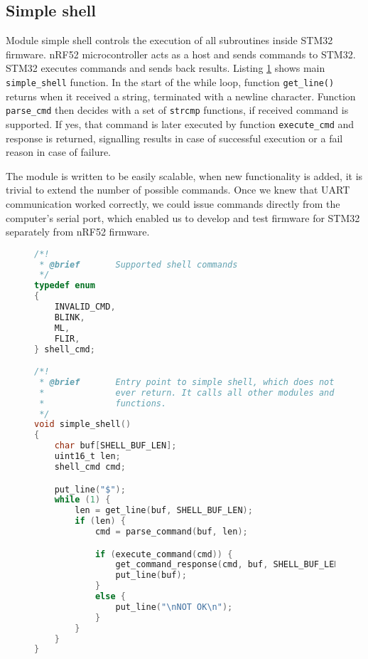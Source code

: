 
\subsection{ Simple shell}

Module simple shell controls the execution of all subroutines inside STM32 firmware.
nRF52 microcontroller acts as a host and sends commands to STM32.
STM32 executes commands and sends back results.
Listing \ref{simple_shell_code} shows main \verb|simple_shell| function.
In the start of the while loop, function \verb|get_line()| returns when it received a string, terminated with a newline character.
Function \verb|parse_cmd| then decides with a set of \verb|strcmp| functions, if received command is supported.
If yes, that command is later executed by function \verb|execute_cmd| and response is returned, signalling results in case of successful execution or a fail reason in case of failure.

The module is written to be easily scalable, when new functionality is added, it is trivial to extend the number of possible commands.
Once we knew that UART communication worked correctly, we could issue commands directly from the computer's serial port, which enabled us to develop and test firmware for STM32 separately from nRF52 firmware.

\lstset{style=mystyle}
\begin{figure}[ht]
\begin{lstlisting}[language=C]
/*!
 * @brief       Supported shell commands
 */
typedef enum 
{
    INVALID_CMD,
    BLINK,
    ML,
    FLIR,
} shell_cmd; 

/*!
 * @brief       Entry point to simple shell, which does not
 *              ever return. It calls all other modules and 
 *              functions.
 */
void simple_shell()
{
    char buf[SHELL_BUF_LEN];
    uint16_t len;
    shell_cmd cmd;

    put_line("$");
    while (1) {
        len = get_line(buf, SHELL_BUF_LEN);
        if (len) {
            cmd = parse_command(buf, len);

            if (execute_command(cmd)) {
                get_command_response(cmd, buf, SHELL_BUF_LEN);
                put_line(buf);
            }
            else {
                put_line("\nNOT OK\n");
            }
        }
    }
}
\end{lstlisting}
\label{simple_shell_code}
\end{figure}


